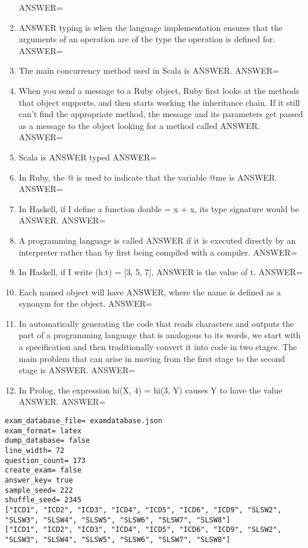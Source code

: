 \documentclass{exam}
\begin{document}
\begin{enumerate}
ANSWER=
\item ANSWER typing is when the language implementation ensures that the arguments of an operation are of the type the operation is defined for.\newline
ANSWER=
\item The main concurrency method used in Scala is ANSWER.\newline
ANSWER=
\item When you send a message to a Ruby object, Ruby first looks at the methods that object supports, and then starts working the inheritance chain.  If it still can't find the appropriate method, the message and its parameters get passed as a message to the object looking for a method called ANSWER.\newline
ANSWER=
\item Scala is ANSWER typed\newline
ANSWER=
\item In Ruby, the @ is used to indicate that the variable @me is ANSWER.\newline
ANSWER=
\item In Haskell, if I define a function double = x + x, its type signature would be ANSWER.\newline
ANSWER=
\item A programming language is called ANSWER if it is executed directly by an interpreter rather than by first being compiled with a compiler.\newline
ANSWER=
\item In Haskell, if I write (h:t) = $\lbrack$3, 5, 7$\rbrack$, ANSWER is the value of t.\newline
ANSWER=
\item Each named object will have ANSWER, where the name is defined as a synonym for the object.\newline
ANSWER=
\item In automatically generating the code that reads characters and outputs the part of a programming language that is analogous to its words, we start with a specification and then traditionally convert it into code in two stages.  The main problem that can arise in moving from the first stage to the second stage is ANSWER.\newline
ANSWER=
\item In Prolog, the expression hi(X, 4) = hi(3, Y) causes Y to have the value ANSWER.\newline
ANSWER=
\end{enumerate}
\newpage
\begin{verbatim}
exam_database_file= examdatabase.json
exam_format= latex
dump_database= false
line_width= 72
question_count= 173
create_exam= false
answer_key= true
sample_seed= 222
shuffle_seed= 2345
["ICD1", "ICD2", "ICD3", "ICD4", "ICD5", "ICD6", "ICD9", "SLSW2",
"SLSW3", "SLSW4", "SLSW5", "SLSW6", "SLSW7", "SLSW8"]
["ICD1", "ICD2", "ICD3", "ICD4", "ICD5", "ICD6", "ICD9", "SLSW2",
"SLSW3", "SLSW4", "SLSW5", "SLSW6", "SLSW7", "SLSW8"]
\end{verbatim}
\end{document}
